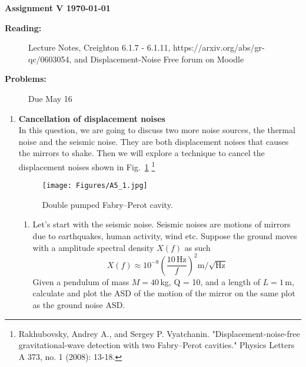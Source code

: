 \documentclass[12pt,twoside]{article}
\begin{document}
%
\centerline{\large\bf  \hfill Assignment V \hfill  \today}

\medskip
\begin{description}
\item[{\bf Reading:}] Lecture Notes, Creighton 6.1.7 - 6.1.11, https://arxiv.org/abs/gr-qc/0603054, and Displacement-Noise Free forum on Moodle \\
\item[{\bf Problems:} \hfill ] Due May 16
\end{description}


\medskip
\begin{enumerate}
\item \textbf{Cancellation of displacement noises}\\
  In this question, we are going to discuss two more noise sources, the thermal noise and the seismic noise. They are both displacement noises that causes the mirrors to shake. Then we will explore a technique to cancel the displacement noises shown in Fig.~\ref{fig:A5_1}
  \footnote{Rakhubovsky, Andrey A., and Sergey P. Vyatchanin. "Displacement-noise-free gravitational-wave detection with two Fabry–Perot cavities." Physics Letters A 373, no. 1 (2008): 13-18.\label{fn:dfpc}}
  \begin{figure}[h]
      \centering
      \texttt{[image: Figures/A5\_1.jpg]}
      \caption{Double pumped Fabry–Perot cavity.}
      \label{fig:A5_1}
  \end{figure}
  \begin{enumerate}

  \item Let's start with the seismic noise. Seismic noises are motions of mirrors due to earthquakes, human activity, wind etc. Suppose the ground moves with a amplitude spectral density $X(f)$ as such
\begin{equation}
    X(f) \approx 10^{-8} \left(\frac{10\,\mbox{Hz}}{f}\right)^2 \mbox{m}/\sqrt{\mbox{Hz}}
\end{equation}
Given a pendulum of mass $M = 40$\,kg, Q = 10, and a length of $L = 1$\,m, calculate and plot the ASD of the motion of the mirror on the same plot as the ground noise ASD.



\end{enumerate}
\end{enumerate}
\end{document}
